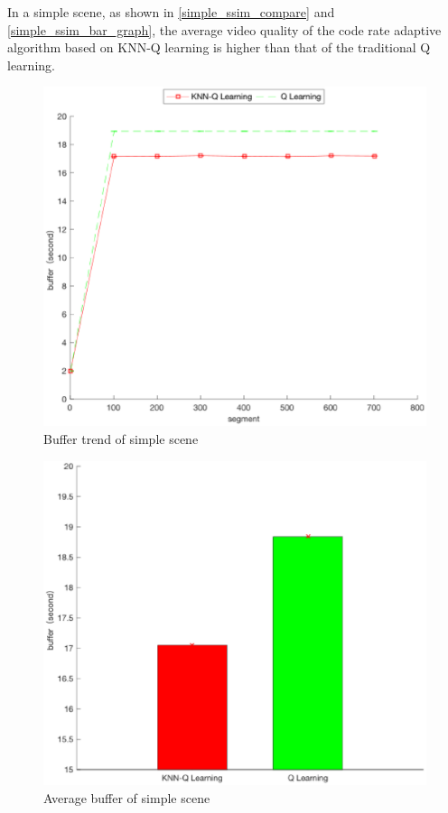 \documentclass[twocolumn]{article}
\begin{document}
In a simple scene, as shown in \ref{simple_ssim_compare} and \ref{simple_ssim_bar_graph},
the average video quality of the code rate adaptive algorithm 
based on KNN-Q learning is higher than that of the traditional Q learning.
\begin{figure}[htbp]
\centering
\includegraphics[width=\columnwidth]{simple_buffer_compare}
\caption{Buffer trend of simple scene}
\label{simple_buffer_compare}
\end{figure}
\begin{figure}[htbp]
\centering
\includegraphics[width=\columnwidth]{simple_buffer_bar_graph}
\caption{Average buffer of simple scene}
\label{simple_buffer_bar_graph}
\end{figure}
\end{document}
